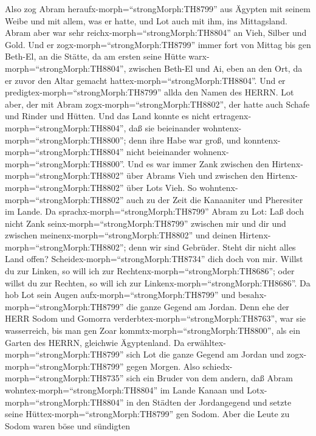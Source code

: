  Also zog Abram heraufx-morph=``strongMorph:TH8799'' aus
Ägypten mit seinem Weibe und mit allem, was er hatte, und Lot auch mit
ihm, ins Mittagsland.  Abram aber war sehr
reichx-morph=``strongMorph:TH8804'' an Vieh, Silber und Gold.
 Und er zogx-morph=``strongMorph:TH8799'' immer fort von
Mittag bis gen Beth-El, an die Stätte, da am ersten seine Hütte
warx-morph=``strongMorph:TH8804'', zwischen Beth-El und Ai, 
eben an den Ort, da er zuvor den Altar gemacht
hattex-morph=``strongMorph:TH8804''. Und er
predigtex-morph=``strongMorph:TH8799'' allda den Namen des HERRN.
 Lot aber, der mit Abram zogx-morph=``strongMorph:TH8802'',
der hatte auch Schafe und Rinder und Hütten.  Und das Land
konnte es nicht ertragenx-morph=``strongMorph:TH8804'', daß sie
beieinander wohntenx-morph=``strongMorph:TH8800''; denn ihre Habe war
groß, und konntenx-morph=``strongMorph:TH8804'' nicht beieinander
wohnenx-morph=``strongMorph:TH8800''.  Und es war immer Zank
zwischen den Hirtenx-morph=``strongMorph:TH8802'' über Abrams Vieh und
zwischen den Hirtenx-morph=``strongMorph:TH8802'' über Lots Vieh. So
wohntenx-morph=``strongMorph:TH8802'' auch zu der Zeit die Kanaaniter
und Pheresiter im Lande.  Da
sprachx-morph=``strongMorph:TH8799'' Abram zu Lot: Laß doch nicht Zank
seinx-morph=``strongMorph:TH8799'' zwischen mir und dir und zwischen
meinenx-morph=``strongMorph:TH8802'' und deinen
Hirtenx-morph=``strongMorph:TH8802''; denn wir sind Gebrüder.
 Steht dir nicht alles Land offen?
Scheidex-morph=``strongMorph:TH8734'' dich doch von mir. Willst du zur
Linken, so will ich zur Rechtenx-morph=``strongMorph:TH8686''; oder
willst du zur Rechten, so will ich zur
Linkenx-morph=``strongMorph:TH8686''.  Da hob Lot sein
Augen aufx-morph=``strongMorph:TH8799'' und
besahx-morph=``strongMorph:TH8799'' die ganze Gegend am Jordan. Denn ehe
der HERR Sodom und Gomorra verderbtex-morph=``strongMorph:TH8763'', war
sie wasserreich, bis man gen Zoar kommtx-morph=``strongMorph:TH8800'',
als ein Garten des HERRN, gleichwie Ägyptenland.  Da
erwähltex-morph=``strongMorph:TH8799'' sich Lot die ganze Gegend am
Jordan und zogx-morph=``strongMorph:TH8799'' gegen Morgen. Also
schiedx-morph=``strongMorph:TH8735'' sich ein Bruder von dem andern,
 daß Abram wohntex-morph=``strongMorph:TH8804'' im Lande
Kanaan und Lotx-morph=``strongMorph:TH8804'' in den Städten der
Jordangegend und setzte seine Hüttex-morph=``strongMorph:TH8799'' gen
Sodom.  Aber die Leute zu Sodom waren böse und sündigten
